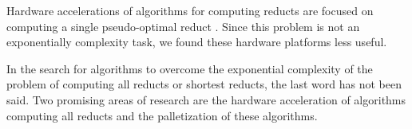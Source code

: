 \documentclass[citenumber]{elsarticle}
\begin{document}
    Hardware accelerations of algorithms for computing reducts are focused on computing a single pseudo-optimal reduct \cite{Tiwari11,Tiwari12,Tiwari13,Grzes13,Kopczynski14,Tiwari14}. Since this problem is not an exponentially complexity task, we found these hardware platforms less useful.	
		    
    In the search for algorithms to overcome the exponential complexity of the problem of computing all reducts or
    shortest reducts, the last word has not been said. Two promising areas of research are the hardware acceleration of algorithms computing all reducts and the palletization of these algorithms.
  
%


\end{document}
